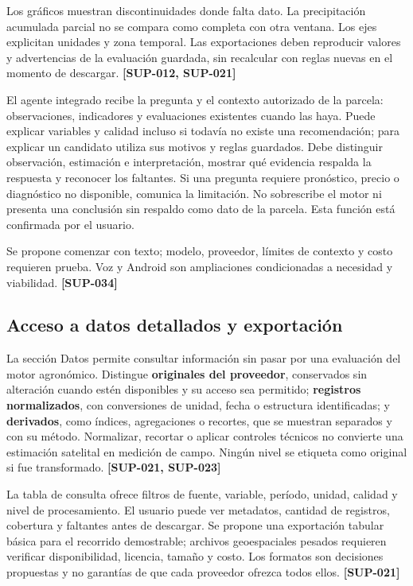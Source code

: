 \documentclass[10pt,a4paper]{article}
\begin{document}
Los gráficos muestran discontinuidades donde falta dato. La precipitación acumulada parcial no se compara como completa con otra ventana. Los ejes explicitan unidades y zona temporal. Las exportaciones deben reproducir valores y advertencias de la evaluación guardada, sin recalcular con reglas nuevas en el momento de descargar. \textbf{[SUP-012, SUP-021]}


El agente integrado recibe la pregunta y el contexto autorizado de la parcela: observaciones, indicadores y evaluaciones existentes cuando las haya. Puede explicar variables y calidad incluso si todavía no existe una recomendación; para explicar un candidato utiliza sus motivos y reglas guardados. Debe distinguir observación, estimación e interpretación, mostrar qué evidencia respalda la respuesta y reconocer los faltantes. Si una pregunta requiere pronóstico, precio o diagnóstico no disponible, comunica la limitación. No sobrescribe el motor ni presenta una conclusión sin respaldo como dato de la parcela. Esta función está confirmada por el usuario.


Se propone comenzar con texto; modelo, proveedor, límites de contexto y costo requieren prueba. Voz y Android son ampliaciones condicionadas a necesidad y viabilidad. \textbf{[SUP-034]}


\subsection{Acceso a datos detallados y exportación}

La sección Datos permite consultar información sin pasar por una evaluación del motor agronómico. Distingue \textbf{originales del proveedor}, conservados sin alteración cuando estén disponibles y su acceso sea permitido; \textbf{registros normalizados}, con conversiones de unidad, fecha o estructura identificadas; y \textbf{derivados}, como índices, agregaciones o recortes, que se muestran separados y con su método. Normalizar, recortar o aplicar controles técnicos no convierte una estimación satelital en medición de campo. Ningún nivel se etiqueta como original si fue transformado. \textbf{[SUP-021, SUP-023]}


La tabla de consulta ofrece filtros de fuente, variable, período, unidad, calidad y nivel de procesamiento. El usuario puede ver metadatos, cantidad de registros, cobertura y faltantes antes de descargar. Se propone una exportación tabular básica para el recorrido demostrable; archivos geoespaciales pesados requieren verificar disponibilidad, licencia, tamaño y costo. Los formatos son decisiones propuestas y no garantías de que cada proveedor ofrezca todos ellos. \textbf{[SUP-021]}
\end{document}
